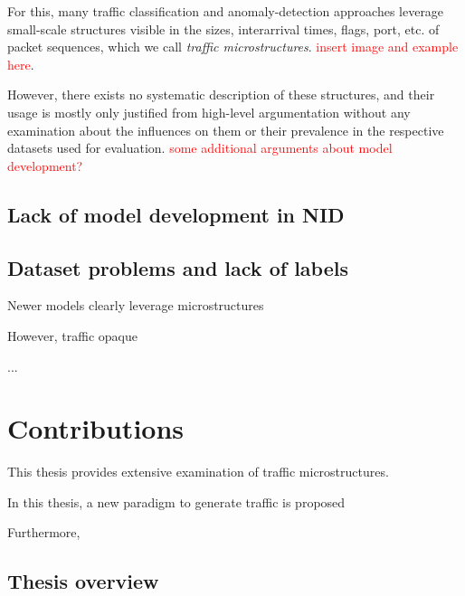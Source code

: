 For this, many traffic classification and anomaly-detection approaches leverage small-scale structures visible in the sizes, interarrival times, flags, port, etc. of packet sequences, which we call \emph{traffic microstructures}. \textcolor{red}{insert image and example here}. 

However, there exists no systematic description of these structures, and their usage is mostly only justified from high-level argumentation without any examination about the influences on them or their prevalence in the respective datasets used for evaluation. \textcolor{red}{some additional arguments about model development?}


\subsection{Lack of model development in NID}


\subsection{Dataset problems and lack of labels}




Newer models clearly leverage microstructures

However, traffic opaque 

...

\section{Contributions}

This thesis provides extensive examination of traffic microstructures.

In this thesis, a new paradigm to generate traffic is proposed

Furthermore, 


\subsection{Thesis overview}
